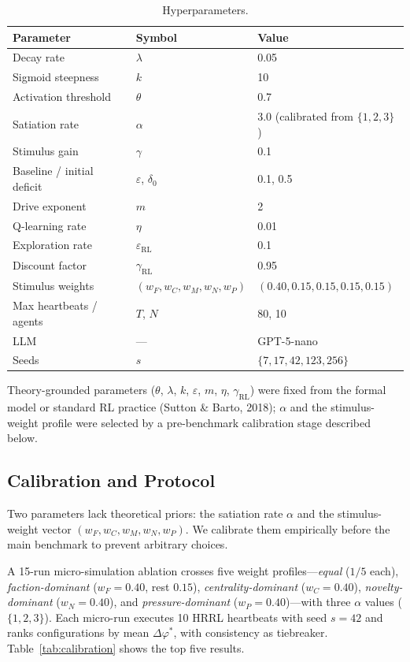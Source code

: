 \documentclass{llncs}
\begin{document}
\begin{table}
\caption{Hyperparameters.}\label{tab:hyperparams}
\small
\begin{tabular}{|l|l|l|}
\hline
\textbf{Parameter} & \textbf{Symbol} & \textbf{Value} \\
\hline
Decay rate & $\lambda$ & 0.05 \\
Sigmoid steepness & $k$ & 10 \\
Activation threshold & $\theta$ & 0.7 \\
Satiation rate & $\alpha$ & 3.0 (calibrated from $\{1,2,3\}$) \\
Stimulus gain & $\gamma$ & 0.1 \\
Baseline / initial deficit & $\varepsilon$, $\delta_0$ & 0.1, 0.5 \\
Drive exponent & $m$ & 2 \\
Q-learning rate & $\eta$ & 0.01 \\
Exploration rate & $\varepsilon_{\text{RL}}$ & 0.1 \\
Discount factor & $\gamma_{\text{RL}}$ & 0.95 \\
Stimulus weights & $(w_F,w_C,w_M,w_N,w_P)$ & $(0.40, 0.15, 0.15, 0.15, 0.15)$ \\
Max heartbeats / agents & $T$, $N$ & 80, 10 \\
LLM & --- & GPT-5-nano \\
Seeds & $s$ & $\{7,17,42,123,256\}$ \\
\hline
\end{tabular}
\end{table}

\noindent Theory-grounded parameters ($\theta$, $\lambda$, $k$, $\varepsilon$,
$m$, $\eta$, $\gamma_{\text{RL}}$) were fixed from the formal model or
standard RL practice (Sutton \& Barto, 2018); $\alpha$ and the
stimulus-weight profile were selected by a pre-benchmark calibration stage
described below.

\subsection{Calibration and Protocol}

Two parameters lack theoretical priors: the satiation rate $\alpha$ and the
stimulus-weight vector $(w_F, w_C, w_M, w_N, w_P)$.  We calibrate them
empirically before the main benchmark to prevent arbitrary choices.

A 15-run micro-simulation ablation crosses five weight profiles---\emph{equal}
($1/5$ each), \emph{faction-dominant} ($w_F{=}0.40$, rest $0.15$),
\emph{centrality-dominant} ($w_C{=}0.40$), \emph{novelty-dominant}
($w_N{=}0.40$), and \emph{pressure-dominant} ($w_P{=}0.40$)---with three
$\alpha$ values ($\{1, 2, 3\}$).  Each micro-run executes 10 HRRL heartbeats
with seed $s{=}42$ and ranks configurations by mean
$\Delta\varphi^*$, with consistency as tiebreaker.
Table~\ref{tab:calibration} shows the top five results.
\end{document}
